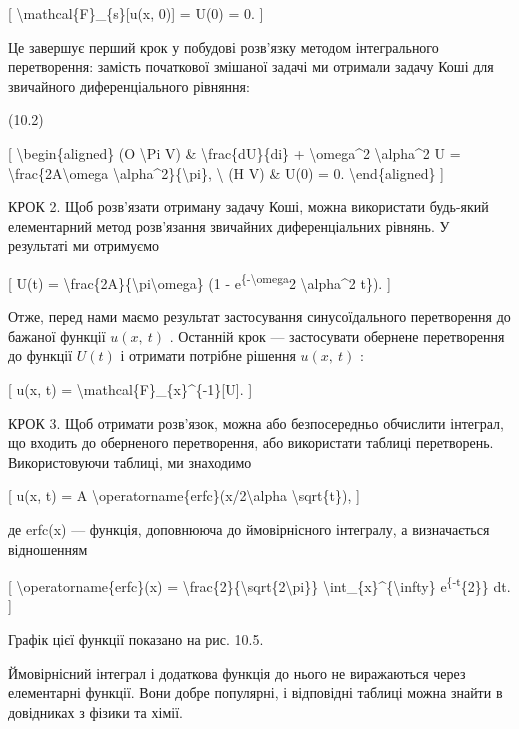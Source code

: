 \documentclass[
]{article}
\begin{document}
{[} \textbackslash mathcal\{F\}\_\{s\}{[}u(x, 0){]} = U(0) = 0. {]}

Це завершує перший крок у побудові розв'язку методом інтегрального
перетворення: замість початкової змішаної задачі ми отримали задачу Коші
для звичайного диференціального рівняння:

(10.2)

{[} \textbackslash begin\{aligned\} (O \textbackslash Pi V) \&
\textbackslash frac\{dU\}\{di\} + \textbackslash omega\^{}2
\textbackslash alpha\^{}2 U =
\textbackslash frac\{2A\textbackslash omega
\textbackslash alpha\^{}2\}\{\textbackslash pi\}, \textbackslash{} (H V)
\& U(0) = 0. \textbackslash end\{aligned\} {]}

КРОК 2. Щоб розв'язати отриману задачу Коші, можна використати будь-який
елементарний метод розв'язання звичайних диференціальних рівнянь. У
результаті ми отримуємо

{[} U(t) =
\textbackslash frac\{2A\}\{\textbackslash pi\textbackslash omega\} (1 -
e\textsuperscript{\{-\textbackslash omega}2 \textbackslash alpha\^{}2
t\}). {]}

Отже, перед нами маємо результат застосування синусоїдального
перетворення до бажаної функції \(u\left(x,\ t\right)\) . Останній крок
--- застосувати обернене перетворення до функції \(U\left(t\right)\) і
отримати потрібне рішення \(u\left(x,\ t\right)\) :

{[} u(x, t) = \textbackslash mathcal\{F\}\_\{x\}\^{}\{-1\}{[}U{]}. {]}

КРОК 3. Щоб отримати розв'язок, можна або безпосередньо обчислити
інтеграл, що входить до оберненого перетворення, або використати таблиці
перетворень. Використовуючи таблиці, ми знаходимо

{[} u(x, t) = A
\textbackslash operatorname\{erfc\}(x/2\textbackslash alpha
\textbackslash sqrt\{t\}), {]}

де erfc(x) --- функція, доповнююча до ймовірнісного інтегралу, а
визначається відношенням

{[} \textbackslash operatorname\{erfc\}(x) =
\textbackslash frac\{2\}\{\textbackslash sqrt\{2\textbackslash pi\}\}
\textbackslash int\_\{x\}\^{}\{\textbackslash infty\}
e\textsuperscript{\{-t}\{2\}\} dt. {]}

Графік цієї функції показано на рис. 10.5.

Ймовірнісний інтеграл і додаткова функція до нього не виражаються через
елементарні функції. Вони добре популярні, і відповідні таблиці можна
знайти в довідниках з фізики та хімії.
\end{document}
